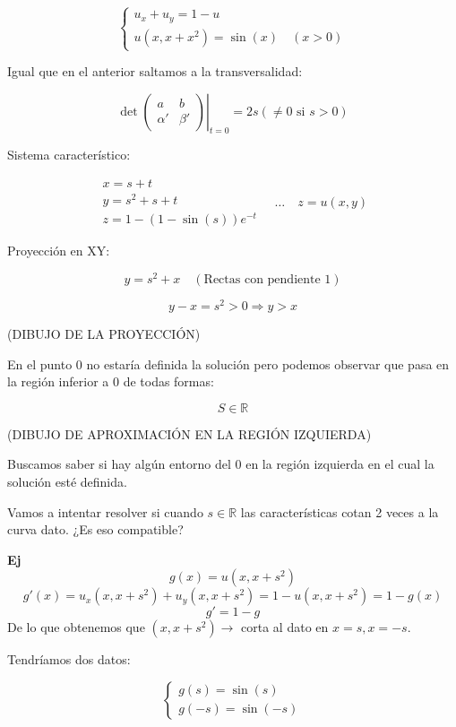 	\begin{example}{8}

		\[
		\left\{
		\begin{array}{l}
			u_x+ u_y = 1 - u\\
			u(x,x+x^2) = \sin(x) \quad (x>0)
		\end{array}
		\right.
		\]

		Igual que en el anterior saltamos a la transversalidad:


		\[\det \left. \begin{pmatrix}
			a & b \\
			\alpha' & \beta'
		\end{pmatrix} \right|_{t=0} = 2s (\neq 0 \text{ si } s > 0) \]


		Sistema característico:

		\[
		\begin{array}{l}
		x = s+t \\
		y = s^2 + s + t \\
		z = 1 - (1 - \sin(s) )e^{-t}
		\end{array} \quad … \quad z = u(x,y)
		\]

		Proyección en XY:

		\[y = s^2 + x \quad(\text{Rectas con pendiente 1})\]

		\[y-x = s^2 > 0 \Rightarrow y > x\]

		(DIBUJO DE LA PROYECCIÓN)

		En el punto 0 no estaría definida la solución pero podemos observar que pasa en la región inferior a 0 de todas formas:

		$$S \in \mathbb{R}$$

		(DIBUJO DE APROXIMACIÓN EN LA REGIÓN IZQUIERDA)

		Buscamos saber si hay algún entorno del 0 en la región izquierda en el cual la solución esté definida.

		Vamos a intentar resolver si cuando $s \in \mathbb{R}$ las características cotan 2 veces a la curva dato. ¿Es eso compatible?

		\textbf{Ej}
		\[g(x) = u(x,x+s^2)\]
		\[g'(x) = u_x (x,x+s^2) + u_y(x,x+s^2) = 1 - u(x,x+s^2) = 1 - g(x)\]
		\[g' = 1-g\]
		De lo que obtenemos que $(x,x+s^2) \rightarrow $ corta al dato en $x=s, x=-s$.

		Tendríamos dos datos:

		\[
		\begin{cases}
		g(s) = \sin(s) \\
		g(-s) = \sin(-s)
		\end{cases}
		\]


\end{example}

